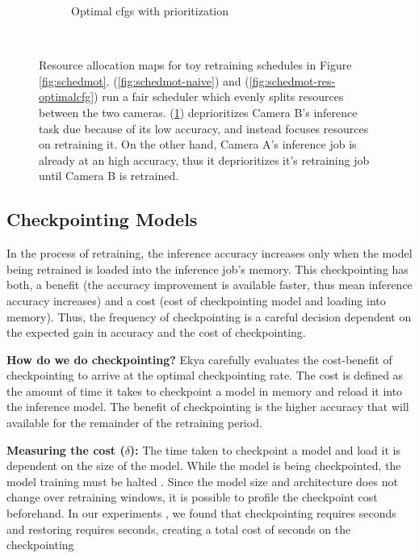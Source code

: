 \begin{figure}[t]
\begin{subfigure}[t]{0.5\columnwidth}
    \caption{Optimal cfgs with prioritization}
    \label{fig:schedmot-res-prioritization}
  \end{subfigure}
  ~~
  \caption{Resource allocation maps for toy retraining schedules in Figure \ref{fig:schedmot}. (\ref{fig:schedmot-naive}) and (\ref{fig:schedmot-res-optimalcfg}) run a fair scheduler which evenly splits resources between the two cameras. (\ref{fig:schedmot-res-prioritization}) deprioritizes Camera B's inference task due because of its low accuracy, and instead focuses resources on retraining it. On the other hand, Camera A's inference job is already at an high accuracy, thus it deprioritizes it's retraining job until Camera B is retrained. }
  \label{fig:schedmot-res}
\end{figure}


\subsection{Checkpointing Models}
\label{subsec:checkpoint}
In the process of retraining, the inference accuracy increases only when the model being retrained is loaded into the inference job's memory. This checkpointing has both, a benefit (the accuracy improvement is available faster, thus mean inference accuracy increases) and a cost (cost of checkpointing model and loading into memory). Thus, the frequency of checkpointing is a careful decision dependent on the expected gain in accuracy and the cost of checkpointing.  

\textbf{How do we do checkpointing?} Ekya carefully evaluates the cost-benefit of checkpointing to arrive at the optimal checkpointing rate. The cost is defined as the amount of time it takes to checkpoint a model in memory and reload it into the inference model. The benefit of checkpointing is the higher accuracy that will available for the remainder of the retraining period.

\textbf{Measuring the cost ($\delta$): } The time taken to checkpoint a model and load it is dependent on the size of the model. While the model is being checkpointed, the model training must be halted . Since the model size and architecture does not change over retraining windows, it is possible to profile the checkpoint cost beforehand. In our experiments , we found that checkpointing requires  seconds and restoring requires  seconds, creating a total cost of \romilc{$\delta$} seconds on the checkpointing 

